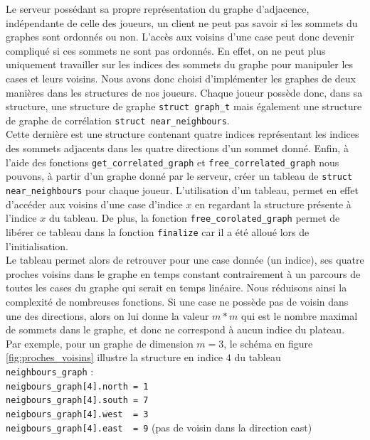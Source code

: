 \documentclass[11pt]{article}
\begin{document}
Le serveur possédant sa propre représentation du graphe d'adjacence, indépendante de celle des joueurs,  un client ne peut pas savoir si les sommets du graphes sont ordonnés ou non. L'accès aux voisins d'une case peut donc devenir compliqué si ces sommets ne sont pas ordonnés. En effet, on ne peut plus uniquement travailler sur les indices des sommets du graphe pour manipuler les cases et leurs voisins. Nous avons donc choisi d'implémenter les graphes de deux manières dans les structures de nos joueurs.
Chaque joueur possède donc, dans sa structure, une structure de graphe \texttt{struct graph\_t} mais également une structure de graphe de corrélation \texttt{struct near\_neighbours}. \\
Cette dernière est une structure contenant quatre indices représentant les indices des sommets adjacents dans les quatre directions d'un sommet donné.
Enfin, à l'aide des fonctions \texttt{get\_correlated\_graph} et \texttt{free\_correlated\_graph} nous pouvons, à partir d'un graphe donné par le serveur, créer un tableau de \texttt{struct near\_neighbours} pour chaque joueur. L'utilisation d'un tableau, permet en effet d'accéder aux voisins d'une case d'indice $x$ en regardant la structure présente à l'indice $x$ du tableau. De plus, la fonction \texttt{free\_corolated\_graph} permet de libérer ce tableau dans la fonction \texttt{finalize} car il a été alloué lors de l'initialisation.\\
Le tableau permet alors de retrouver pour une case donnée (un indice), ses quatre proches voisins dans le graphe en temps constant contrairement à un parcours de toutes les cases du graphe qui serait en temps linéaire. Nous réduisons ainsi la complexité de nombreuses fonctions. Si une case ne possède pas de voisin dans une des directions, alors on lui donne la valeur $m*m$ qui est le nombre maximal de sommets dans le graphe, et donc ne correspond à aucun indice du plateau. \\

\noindent Par exemple, pour un graphe de dimension $m = 3$, le schéma en figure \ref{fig:proches_voisins} illustre la structure en indice $4$ du tableau \texttt{neighbours\_graph} : \\
\indent \texttt{neigbours\_graph[4].north = 1\\ 
        \indent neigbours\_graph[4].south = 7\\
        \indent neigbours\_graph[4].west \ = 3\\
        \indent neigbours\_graph[4].east \ = 9} (pas de voisin dans la direction east) \\
        
\end{document}
